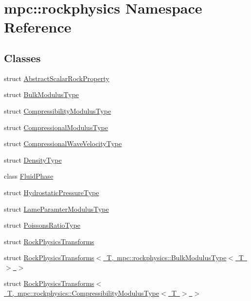 \hypertarget{namespacempc_1_1rockphysics}{}\section{mpc\+:\+:rockphysics Namespace Reference}
\label{namespacempc_1_1rockphysics}
\subsection*{Classes}
\begin{DoxyCompactItemize}
\item 
struct \mbox{\hyperlink{structmpc_1_1rockphysics_1_1_abstract_scalar_rock_property}{Abstract\+Scalar\+Rock\+Property}}
\item 
struct \mbox{\hyperlink{structmpc_1_1rockphysics_1_1_bulk_modulus_type}{Bulk\+Modulus\+Type}}
\item 
struct \mbox{\hyperlink{structmpc_1_1rockphysics_1_1_compressibility_modulus_type}{Compressibility\+Modulus\+Type}}
\item 
struct \mbox{\hyperlink{structmpc_1_1rockphysics_1_1_compressional_modulus_type}{Compressional\+Modulus\+Type}}
\item 
struct \mbox{\hyperlink{structmpc_1_1rockphysics_1_1_compressional_wave_velocity_type}{Compressional\+Wave\+Velocity\+Type}}
\item 
struct \mbox{\hyperlink{structmpc_1_1rockphysics_1_1_density_type}{Density\+Type}}
\item 
class \mbox{\hyperlink{classmpc_1_1rockphysics_1_1_fluid_phase}{Fluid\+Phase}}
\item 
struct \mbox{\hyperlink{structmpc_1_1rockphysics_1_1_hydrostatic_pressure_type}{Hydrostatic\+Pressure\+Type}}
\item 
struct \mbox{\hyperlink{structmpc_1_1rockphysics_1_1_lame_paramter_modulus_type}{Lame\+Paramter\+Modulus\+Type}}
\item 
struct \mbox{\hyperlink{structmpc_1_1rockphysics_1_1_poissons_ratio_type}{Poissons\+Ratio\+Type}}
\item 
struct \mbox{\hyperlink{structmpc_1_1rockphysics_1_1_rock_physics_transforms}{Rock\+Physics\+Transforms}}
\item 
struct \mbox{\hyperlink{structmpc_1_1rockphysics_1_1_rock_physics_transforms_3_01_t_00_01mpc_1_1rockphysics_1_1_bulk_modulus_type_3_01_t_01_4_01_4}{Rock\+Physics\+Transforms$<$ T, mpc\+::rockphysics\+::\+Bulk\+Modulus\+Type$<$ T $>$ $>$}}
\item 
struct \mbox{\hyperlink{structmpc_1_1rockphysics_1_1_rock_physics_transforms_3_01_t_00_01mpc_1_1rockphysics_1_1_compress029d68897a9e33d88bc676cbccd09ca6}{Rock\+Physics\+Transforms$<$ T, mpc\+::rockphysics\+::\+Compressibility\+Modulus\+Type$<$ T $>$ $>$}}

\end{DoxyCompactItemize}
